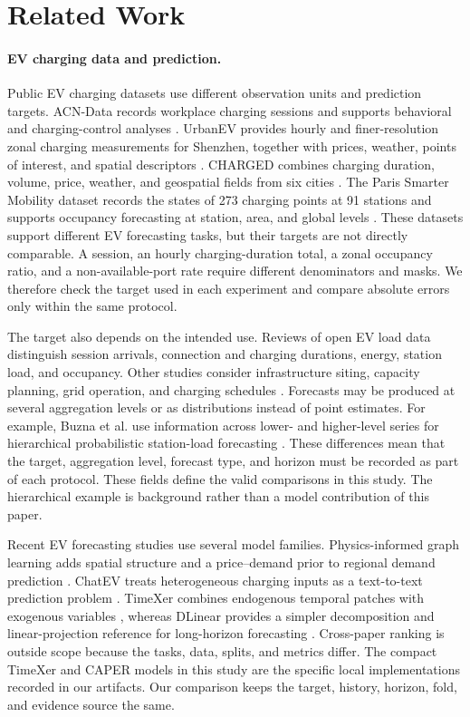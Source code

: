 \section{Related Work}
\label{sec:related-work}

\paragraph{EV charging data and prediction.}
Public EV charging datasets use different observation units and prediction targets.  ACN-Data records workplace charging sessions and supports behavioral and charging-control analyses \cite{lee2019acndata}.  UrbanEV provides hourly and finer-resolution zonal charging measurements for Shenzhen, together with prices, weather, points of interest, and spatial descriptors \cite{li2025urbanev}.  CHARGED combines charging duration, volume, price, weather, and geospatial fields from six cities \cite{guo2025charged}.  The Paris Smarter Mobility dataset records the states of 273 charging points at 91 stations and supports occupancy forecasting at station, area, and global levels \cite{amaraouali2024smarter,amaraouali2023parisdataset}.  These datasets support different EV forecasting tasks, but their targets are not directly comparable.  A session, an hourly charging-duration total, a zonal occupancy ratio, and a non-available-port rate require different denominators and masks.  We therefore check the target used in each experiment and compare absolute errors only within the same protocol.

The target also depends on the intended use.  Reviews of open EV load data distinguish session arrivals, connection and charging durations, energy, station load, and occupancy.  Other studies consider infrastructure siting, capacity planning, grid operation, and charging schedules \cite{amaraouali2021review,rashid2024survey}.  Forecasts may be produced at several aggregation levels or as distributions instead of point estimates.  For example, Buzna et al. use information across lower- and higher-level series for hierarchical probabilistic station-load forecasting \cite{buzna2021hierarchical}.  These differences mean that the target, aggregation level, forecast type, and horizon must be recorded as part of each protocol.  These fields define the valid comparisons in this study.  The hierarchical example is background rather than a model contribution of this paper.

Recent EV forecasting studies use several model families.  Physics-informed graph learning adds spatial structure and a price--demand prior to regional demand prediction \cite{qu2024pag}.  ChatEV treats heterogeneous charging inputs as a text-to-text prediction problem \cite{qu2024chatev}.  TimeXer combines endogenous temporal patches with exogenous variables \cite{wang2024timexer}, whereas DLinear provides a simpler decomposition and linear-projection reference for long-horizon forecasting \cite{zeng2023dlinear}.  Cross-paper ranking is outside scope because the tasks, data, splits, and metrics differ.  The compact TimeXer and CAPER models in this study are the specific local implementations recorded in our artifacts.  Our comparison keeps the target, history, horizon, fold, and evidence source the same.

